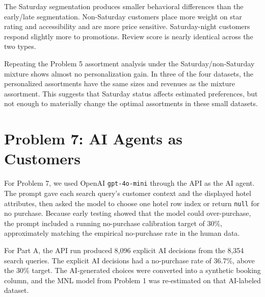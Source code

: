 \documentclass[11pt]{article}
\begin{document}
The Saturday segmentation produces smaller behavioral differences than the early/late segmentation. Non-Saturday customers place more weight on star rating and accessibility and are more price sensitive. Saturday-night customers respond slightly more to promotions. Review score is nearly identical across the two types.

\begin{table}[H]
\centering
\caption{Problem 6 assortment results for Saturday vs. non-Saturday types.}
\end{table}

Repeating the Problem 5 assortment analysis under the Saturday/non-Saturday mixture shows almost no personalization gain. In three of the four datasets, the personalized assortments have the same sizes and revenues as the mixture assortment. This suggests that Saturday status affects estimated preferences, but not enough to materially change the optimal assortments in these small datasets.

\section{Problem 7: AI Agents as Customers}

For Problem 7, we used OpenAI \texttt{gpt-4o-mini} through the API as the AI agent. The prompt gave each search query's customer context and the displayed hotel attributes, then asked the model to choose one hotel row index or return \texttt{null} for no purchase. Because early testing showed that the model could over-purchase, the prompt included a running no-purchase calibration target of 30\%, approximately matching the empirical no-purchase rate in the human data.

For Part A, the API run produced 8,096 explicit AI decisions from the 8,354 search queries. The explicit AI decisions had a no-purchase rate of 36.7\%, above the 30\% target. The AI-generated choices were converted into a synthetic booking column, and the MNL model from Problem 1 was re-estimated on that AI-labeled dataset.
\end{document}
